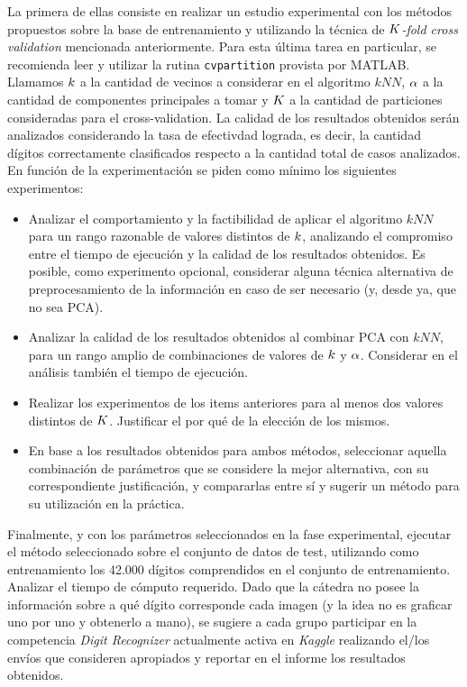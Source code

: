 La primera de ellas consiste en realizar un estudio experimental con los m\'etodos propuestos sobre la base de entrenamiento y utilizando la t\'ecnica de \emph{$K$-fold cross validation} mencionada anteriormente. Para esta \'ultima tarea en particular, se recomienda leer y utilizar la rutina \verb+cvpartition+ provista por MATLAB. Llamamos $k$ a la cantidad de vecinos a considerar en el algoritmo $kNN$, $\alpha$ a la cantidad de componentes principales a tomar y $K$ a la cantidad de particiones consideradas para el cross-validation. La calidad de los resultados obtenidos ser\'an analizados considerando la tasa de efectivdad lograda, es decir, la cantidad d\'igitos correctamente clasificados respecto a la cantidad total de casos analizados. En funci\'on de la experimentaci\'on se piden como m\'inimo los siguientes experimentos:
\begin{itemize}
\item Analizar el comportamiento y la factibilidad de aplicar el algoritmo $kNN$ para un rango razonable de valores distintos de $k$, analizando el compromiso entre el tiempo de ejecuci\'on y la calidad de los resultados obtenidos. Es posible, como experimento opcional, considerar alguna t\'ecnica alternativa de preprocesamiento de la informaci\'on en caso de ser necesario (y, desde ya, que no sea PCA). 
\item Analizar la calidad de los resultados obtenidos al combinar PCA con $kNN$, para un rango amplio de combinaciones de valores de $k$ y $\alpha$. Considerar en el an\'alisis tambi\'en el tiempo de ejecuci\'on.
\item Realizar los experimentos de los items anteriores para al menos dos valores distintos de $K$. Justificar el por qu\'e de la elecci\'on de los mismos.
\item En base a los resultados obtenidos para ambos m\'etodos, seleccionar aquella combinaci\'on de par\'ametros que se considere la mejor alternativa, con su correspondiente justificaci\'on, y compararlas entre s\'i y sugerir un m\'etodo para su utilizaci\'on en la pr\'actica.
\end{itemize}

Finalmente, y con los par\'ametros seleccionados en la fase experimental, ejecutar el m\'etodo seleccionado sobre el conjunto de datos de test, utilizando como entrenamiento los 42.000 d\'igitos comprendidos en el conjunto de entrenamiento. Analizar el tiempo de c\'omputo requerido. Dado que la c\'atedra no posee la informaci\'on sobre a qu\'e d\'igito corresponde cada imagen (y la idea no es graficar uno por uno y obtenerlo a mano), se sugiere a cada grupo participar en la competencia \emph{Digit Recognizer} actualmente activa en \emph{Kaggle} realizando el/los env\'ios que consideren apropiados y reportar en el informe los resultados obtenidos.\\

